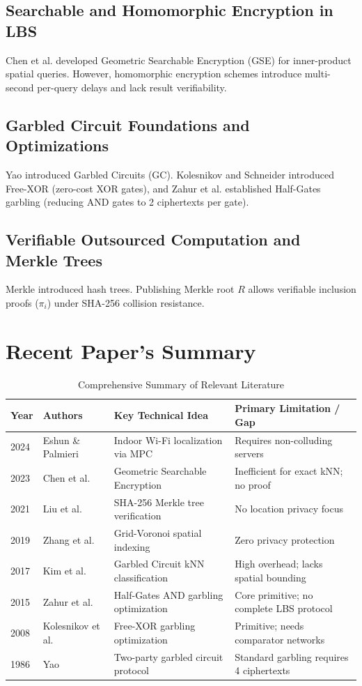 \documentclass[12pt,a4paper,oneside]{report}
\begin{document}
\subsection{Searchable and Homomorphic Encryption in LBS}
Chen et al. developed Geometric Searchable Encryption (GSE) for inner-product spatial queries. However, homomorphic encryption schemes introduce multi-second per-query delays and lack result verifiability.

\subsection{Garbled Circuit Foundations and Optimizations}
Yao introduced Garbled Circuits (GC). Kolesnikov and Schneider introduced Free-XOR (zero-cost XOR gates), and Zahur et al. established Half-Gates garbling (reducing AND gates to 2 ciphertexts per gate).

\subsection{Verifiable Outsourced Computation and Merkle Trees}
Merkle introduced hash trees. Publishing Merkle root $R$ allows verifiable inclusion proofs ($\pi_i$) under SHA-256 collision resistance.

\section{Recent Paper's Summary}
\begin{table}[h!]
\centering
\caption{Comprehensive Summary of Relevant Literature}
\label{tab:lit_summary}
\small
\begin{tabular}{p{2cm}p{3.5cm}p{4.5cm}p{4.5cm}}
\toprule
\textbf{Year} & \textbf{Authors} & \textbf{Key Technical Idea} & \textbf{Primary Limitation / Gap} \\
\midrule
2024 & Eshun \& Palmieri & Indoor Wi-Fi localization via MPC & Requires non-colluding servers \\
2023 & Chen et al. & Geometric Searchable Encryption & Inefficient for exact kNN; no proof \\
2021 & Liu et al. & SHA-256 Merkle tree verification & No location privacy focus \\
2019 & Zhang et al. & Grid-Voronoi spatial indexing & Zero privacy protection \\
2017 & Kim et al. & Garbled Circuit kNN classification & High overhead; lacks spatial bounding \\
2015 & Zahur et al. & Half-Gates AND garbling optimization & Core primitive; no complete LBS protocol \\
2008 & Kolesnikov et al. & Free-XOR garbling optimization & Primitive; needs comparator networks \\
1986 & Yao & Two-party garbled circuit protocol & Standard garbling requires 4 ciphertexts \\
\bottomrule
\end{tabular}
\end{table}
\end{document}
